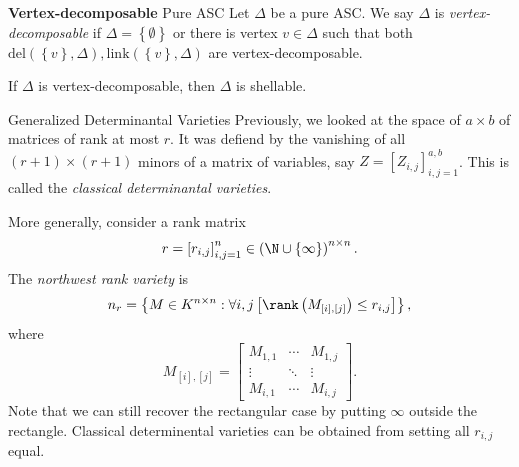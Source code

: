 \documentclass[co439]{subfiles}
\begin{document}
    \begin{definition}{\textbf{Vertex-decomposable} Pure ASC}
        Let $\Delta$ be a pure ASC. We say $\Delta$ is \emph{vertex-decomposable} if $\Delta = \left\lbrace \emptyset \right\rbrace$ or there is vertex $v\in\Delta$ such that both $\text{del}\left( \left\lbrace v \right\rbrace,\Delta \right),\text{link}\left( \left\lbrace v \right\rbrace,\Delta \right)$ are vertex-decomposable.
    \end{definition}
    
    \begin{theorem}{}
        If $\Delta$ is vertex-decomposable, then $\Delta$ is shellable.
    \end{theorem}

    \rruleline
    
    \begin{example}{Generalized Determinantal Varieties}
        Previously, we looked at the space of $a\times b$ of matrices of rank at most $r$. It was defiend by the vanishing of all $\left( r+1 \right)\times\left( r+1 \right)$ minors of a matrix of variables, say $Z = \left[ Z_{i,j} \right]^{a,b}_{i,j=1}$. This is called the \textit{classical determinantal varieties}.

        More generally, consider a rank matrix
        \begin{equation*}
            r = \left[ r_{i,j} \right]^n_{i,j=1}\in \left( \N\cup\left\lbrace \infty \right\rbrace \right)^{n\times n}.
        \end{equation*}
        The \emph{northwest rank variety} is
        \begin{equation*}
            n_r = \left\lbrace M\in K^{n\times n}:\forall i,j \left[\rank\left( M_{\left[ i \right],\left[ j \right]} \right)\leq r_{i,j}\right]  \right\rbrace,
        \end{equation*}
        where
        \begin{equation*}
            M_{\left[ i \right],\left[ j \right]} = \begin{bmatrix} M_{1,1} & \cdots & M_{1,j} \\ \vdots & \ddots & \vdots \\ M_{i,1} & \cdots & M_{i,j} \end{bmatrix}.
        \end{equation*}
        Note that we can still recover the rectangular case by putting $\infty$ outside the rectangle. Classical determinental varieties can be obtained from setting all $r_{i,j}$ equal.


\end{example}
\end{document}
